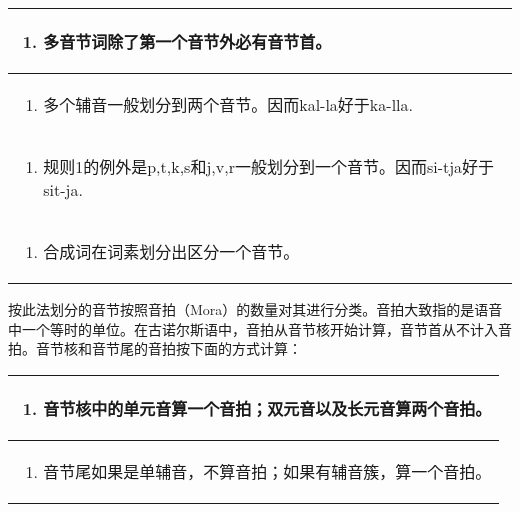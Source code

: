 \begin{longtable}{l}
\toprule
\begin{enumerate}\def\labelenumi{\arabic{enumi}.}\item  多音节词除了第一个音节外必有音节首。\end{enumerate} \\
\midrule
\endhead
\bottomrule
\endfoot
\begin{minipage}[t]{\linewidth}\raggedright
\begin{enumerate}
\def\labelenumi{\arabic{enumi}.}
\setcounter{enumi}{1}
\item
  多个辅音一般划分到两个音节。因而kal-la好于ka-lla.
\end{enumerate}
\end{minipage} \\
\begin{minipage}[t]{\linewidth}\raggedright
\begin{enumerate}
\def\labelenumi{\arabic{enumi}.}
\setcounter{enumi}{2}
\item
  规则1的例外是p,t,k,s和j,v,r一般划分到一个音节。因而si-tja好于sit-ja.
\end{enumerate}
\end{minipage} \\
\begin{minipage}[t]{\linewidth}\raggedright
\begin{enumerate}
\def\labelenumi{\arabic{enumi}.}
\setcounter{enumi}{3}
\item
  合成词在词素划分出区分一个音节。
\end{enumerate}
\end{minipage} \\
\end{longtable}

按此法划分的音节按照音拍（Mora）的数量对其进行分类。音拍大致指的是语音中一个等时的单位。在古诺尔斯语中，音拍从音节核开始计算，音节首从不计入音拍。音节核和音节尾的音拍按下面的方式计算：

\begin{longtable}{l}
\toprule
\begin{enumerate}\def\labelenumi{\arabic{enumi}.}\item  音节核中的单元音算一个音拍；双元音以及长元音算两个音拍。\end{enumerate} \\
\midrule
\endhead
\bottomrule
\endfoot
\begin{minipage}[t]{\linewidth}\raggedright
\begin{enumerate}
\def\labelenumi{\arabic{enumi}.}
\setcounter{enumi}{1}
\item
  音节尾如果是单辅音，不算音拍；如果有辅音簇，算一个音拍。
\end{enumerate}
\end{minipage} \\
\end{longtable}

